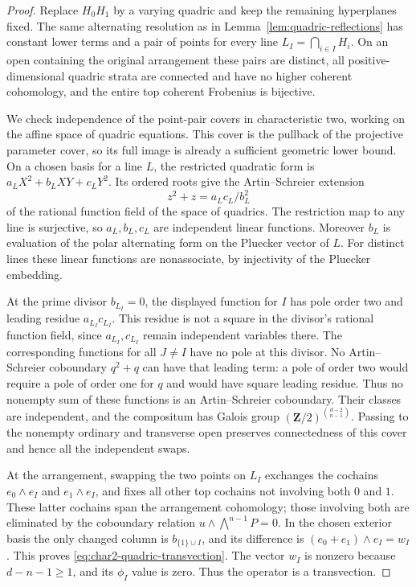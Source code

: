 \begin{proof}
Replace $H_0H_1$ by a varying quadric and keep the remaining
hyperplanes fixed.  The same alternating resolution as in
Lemma~\ref{lem:quadric-reflections} has constant lower terms
and a pair of points for every line
$L_I=\bigcap_{i\in I}H_i$.  On an open containing the original
arrangement these pairs are distinct, all positive-dimensional
quadric strata are connected and have no higher coherent
cohomology, and the entire top coherent Frobenius is bijective.

We check independence of the point-pair covers in characteristic
two, working on the affine space of quadric equations.  This
cover is the pullback of the projective parameter cover, so
its full image is already a sufficient geometric lower bound.
On a chosen basis for a line $L$, the restricted quadratic
form is $a_LX^2+b_LXY+c_LY^2$.  Its ordered roots give the
Artin--Schreier extension
\[
 z^2+z=a_Lc_L/b_L^2
\]
of the rational function field of the space of quadrics.
The restriction map to any line is surjective, so
$a_L,b_L,c_L$ are independent linear functions.
Moreover $b_L$ is evaluation of the polar alternating form
on the Pluecker vector of $L$.  For distinct lines these
linear functions are nonassociate, by injectivity of the
Pluecker embedding.

At the prime divisor $b_{L_I}=0$, the displayed function for
$I$ has pole order two and leading residue $a_{L_I}c_{L_I}$.
This residue is not a square in the divisor's rational
function field, since $a_{L_I},c_{L_I}$ remain independent
variables there.  The corresponding functions for all
$J\ne I$ have no pole at this divisor.
No Artin--Schreier coboundary $q^2+q$ can have that leading
term: a pole of order two would require a pole of order one
for $q$ and would have square leading residue.  Thus no
nonempty sum of these functions is an Artin--Schreier
coboundary.  Their classes are independent, and the compositum
has Galois group $(\mathbf Z/2)^{\binom{d-2}{n-1}}$.
Passing to the nonempty ordinary and transverse open preserves
connectedness of this cover and hence all the independent swaps.

At the arrangement, swapping the two points on $L_I$ exchanges
the cochains $e_0\wedge e_I$ and $e_1\wedge e_I$, and fixes
all other top cochains not involving both $0$ and $1$.
These latter cochains span the arrangement cohomology; those
involving both are eliminated by the coboundary relation
$u\wedge\bigwedge^{n-1}P=0$.
In the chosen exterior basis the only changed column is
$b_{\{1\}\cup I}$, and its difference is
$(e_0+e_1)\wedge e_I=w_I$.
This proves \eqref{eq:char2-quadric-transvection}.
The vector $w_I$ is nonzero because
$d-n-1\geq1$, and its $\phi_I$ value is zero.
Thus the operator is a transvection.
\end{proof}

